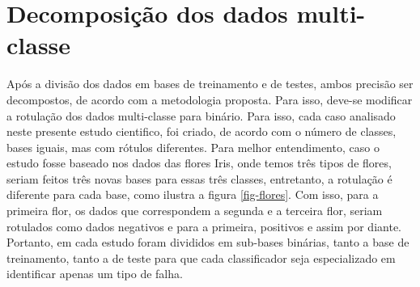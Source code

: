 \section{Decomposição dos dados multi-classe}

Após a divisão dos dados em bases de treinamento e de testes, ambos precisão ser decompostos, de acordo com a metodologia proposta. Para isso, deve-se modificar a rotulação dos dados multi-classe para binário. Para isso, cada caso analisado neste presente estudo cientifico, foi criado, de acordo com o número de classes, bases iguais, mas com rótulos diferentes. Para melhor entendimento, caso o estudo fosse baseado nos dados das flores Iris, onde temos três tipos de flores, seriam feitos três novas bases para essas três classes, entretanto, a rotulação é diferente para cada base, como ilustra a figura \ref{fig-flores}. Com isso, para a primeira flor, os dados que correspondem a segunda e a terceira flor, seriam rotulados como dados negativos e para a primeira, positivos e assim por diante. Portanto, em cada estudo foram divididos em sub-bases binárias, tanto a base de treinamento, tanto a de teste para que cada classificador seja especializado em identificar apenas um tipo de falha.

\usetikzlibrary{positioning}

